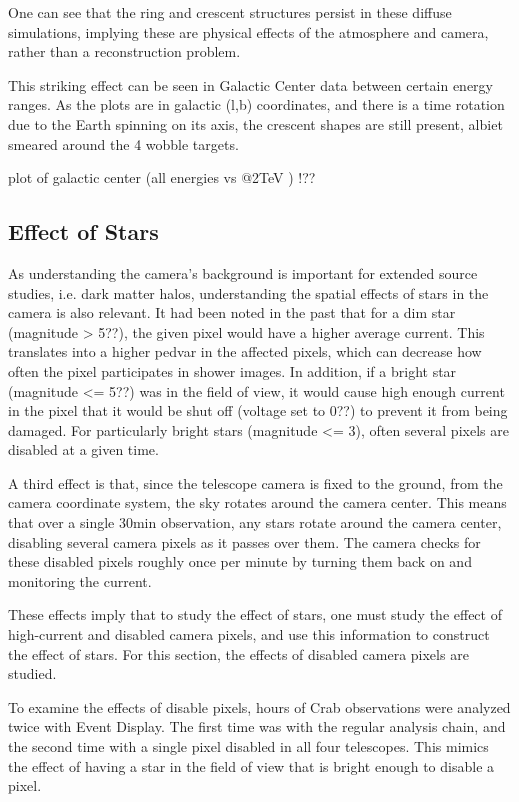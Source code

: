 One can see that the ring and crescent structures persist in these diffuse simulations, implying these are physical effects of the atmosphere and camera, rather than a reconstruction problem.

This striking effect can be seen in Galactic Center data between certain energy ranges.
As the plots are in galactic (l,b) coordinates, and there is a time rotation due to the Earth spinning on its axis, the crescent shapes are still present, albiet smeared around the 4 wobble targets.

plot of galactic center (all energies vs @2TeV ) !??

\subsection{Effect of Stars}
As understanding the camera's background is important for extended source studies, i.e. dark matter halos, understanding the spatial effects of stars in the camera is also relevant.
It had been noted in the past that for a dim star (magnitude > 5??), the given pixel would have a higher average current.
This translates into a higher pedvar in the affected pixels, which can decrease how often the pixel participates in shower images.
In addition, if a bright star (magnitude <= 5??) was in the field of view, it would cause high enough current in the pixel that it would be shut off (voltage set to 0??) to prevent it from being damaged.
For particularly bright stars (magnitude <= 3), often several pixels are disabled at a given time.

A third effect is that, since the telescope camera is fixed to the ground, from the camera coordinate system, the sky rotates around the camera center.
This means that over a single 30min observation, any stars rotate around the camera center, disabling several camera pixels as it passes over them.
The camera checks for these disabled pixels roughly once per minute by turning them back on and monitoring the current.

These effects imply that to study the effect of stars, one must study the effect of high-current and disabled camera pixels, and use this information to construct the effect of stars.
For this section, the effects of disabled camera pixels are studied.

To examine the effects of disable pixels,  hours of Crab observations were analyzed twice with Event Display.
The first time was with the regular analysis chain, and the second time with a single pixel disabled in all four telescopes.
This mimics the effect of having a star in the field of view that is bright enough to disable a pixel.

